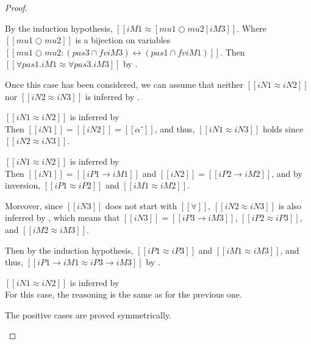 \begin{proof}
\begin{caseof}
      By the induction hypothesis, $[[iM1 ≈ [mu1 ○ mu2] iM3]]$.
      Where $[[mu1 ○ mu2]]$ is a bijection on variables
      $[[mu1 ○ mu2 : ({pas3} ∩ fv iM3) ↔ ({pas1} ∩ fv iM1)]]$.
      Then $[[∀pas1.iM1 ≈ ∀pas3.iM3]]$ by .

      Once this case has been considered, 
      we can assume that neither $[[iN1 ≈ iN2]]$ nor $[[iN2 ≈ iN3]]$
      is inferred by .

    \item $[[iN1 ≈ iN2]]$ is inferred by 
      \\
      Then $[[iN1]] = [[iN2]] = [[α⁻]]$, and thus,  
      $[[iN1 ≈ iN3]]$ holds since $[[iN2 ≈ iN3]]$.

    \item $[[iN1 ≈ iN2]]$ is inferred by 
      \\
      Then $[[iN1]] = [[iP1 → iM1]]$ and $[[iN2]] = [[iP2 → iM2]]$,
      and by inversion, $[[iP1 ≈ iP2]]$ and $[[iM1 ≈ iM2]]$.

      Moreover, since $[[iN3]]$ does not start with $[[∀]]$,
      $[[iN2 ≈ iN3]]$ is also inferred by 
      ,
      which means that $[[iN3]] = [[iP3 → iM3]]$,
      $[[iP2 ≈ iP3]]$, and $[[iM2 ≈ iM3]]$.

      Then by the induction hypothesis, 
      $[[iP1 ≈ iP3]]$ and $[[iM1 ≈ iM3]]$, and thus, 
      $[[iP1 → iM1 ≈ iP3 → iM3]]$ by .
    \item $[[iN1 ≈ iN2]]$ is inferred by
      \\
      For this case, the reasoning is the same as for the previous one.
    \item The positive cases are proved symmetrically.
  \end{caseof}
\end{proof}

